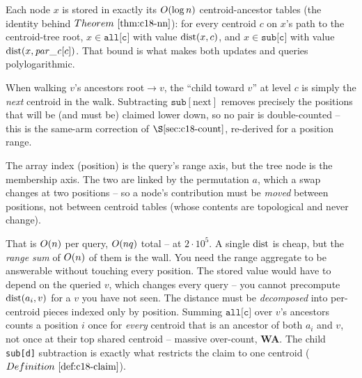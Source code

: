 \begin{observation}
Each node \(x\) is stored in exactly its \(O(\log n)\) centroid-ancestor tables (the identity
behind \(\thmref{c18-nn}\)): for every centroid \(c\) on \(x\)'s path to the centroid-tree root,
\(x\in\texttt{all[c]}\) with value \(\operatorname{dist}(x,c)\), and \(x\in\texttt{sub[c]}\) with value
\(\operatorname{dist}(x,\mathit{par\_c}[c])\). That bound is what makes both updates and queries polylogarithmic.
\end{observation}
\begin{observation}
When walking \(v\)'s ancestors root\(\to v\), the ``child toward \(v\)'' at level \(c\) is simply the
\emph{next} centroid in the walk. Subtracting \(\texttt{sub}[\text{next}]\) removes precisely the
positions that will be (and must be) claimed lower down, so no pair is double-counted -- this is the
same-arm correction of \(\secref{c18-count}\), re-derived for a position range.
\end{observation}
\begin{observation}
The array index (position) is the query's range axis, but the tree node is the membership axis. The
two are linked by the permutation \(a\), which a swap changes at two positions -- so a node's
contribution must be \emph{moved} between positions, not between centroid tables (whose contents are
topological and never change).
\end{observation}

\begin{thinkbox}
{That is \(O(n)\) per query, \(O(nq)\) total -- \tle at \(2\cdot10^5\). A single \(\operatorname{dist}\) is
cheap, but the \emph{range sum} of \(O(n)\) of them is the wall. You need the range aggregate to
be answerable without touching every position.}
{The stored value would have to depend on the queried \(v\), which changes every query -- you cannot
precompute \(\operatorname{dist}(a_i,v)\) for a \(v\) you have not seen. The distance must be \emph{decomposed}
into per-centroid pieces indexed only by position.}
{Summing \(\texttt{all[c]}\) over \(v\)'s ancestors counts a position \(i\) once for \emph{every}
centroid that is an ancestor of both \(a_i\) and \(v\), not once at their top shared centroid --
massive over-count, \textbf{WA}. The child \texttt{sub[d]} subtraction is exactly what restricts the
claim to one centroid (\(\defref{c18-claim}\)).}
\end{thinkbox}

